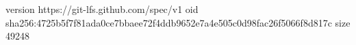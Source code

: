 version https://git-lfs.github.com/spec/v1
oid sha256:4725b5f7f81ada0ce7bbaee72f4ddb9652e7a4e505c0d98fac26f5066f8d817c
size 49248
